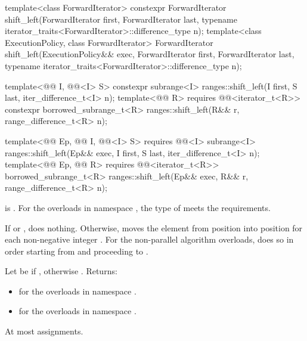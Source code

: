 %
\begin{itemdecl}
template<class ForwardIterator>
  constexpr ForwardIterator
    shift_left(ForwardIterator first, ForwardIterator last,
               typename iterator_traits<ForwardIterator>::difference_type n);
template<class ExecutionPolicy, class ForwardIterator>
  ForwardIterator
    shift_left(ExecutionPolicy&& exec, ForwardIterator first, ForwardIterator last,
               typename iterator_traits<ForwardIterator>::difference_type n);

template<@@ I, @@<I> S>
  constexpr subrange<I> ranges::shift_left(I first, S last, iter_difference_t<I> n);
template<@@ R>
  requires @@<iterator_t<R>>
  constexpr borrowed_subrange_t<R> ranges::shift_left(R&& r, range_difference_t<R> n);

template<@@ Ep, @@ I, @@<I> S>
  requires @@<I>
  subrange<I>
    ranges::shift_left(Ep&& exec, I first, S last, iter_difference_t<I> n);
template<@@ Ep, @@ R>
  requires @@<iterator_t<R>>
  borrowed_subrange_t<R>
    ranges::shift_left(Ep&& exec, R&& r, range_difference_t<R> n);
\end{itemdecl}

\begin{itemdescr}
\pnum
\expects
{} is .
For the overloads in namespace ,
the type of  meets the  requirements.

\pnum
\effects
If  or , does nothing.
Otherwise, moves the element
from position 
into position 
for each non-negative integer .
For the non-parallel algorithm overloads,
does so in order starting
from  and proceeding to .

\pnum
\returns
Let  be 
if ,
otherwise .
Returns:
\begin{itemize}
\item
{} for the overloads in namespace .
\item
{}
for the overloads in namespace .
\end{itemize}

\pnum
\complexity
At most  assignments.
\end{itemdescr}

